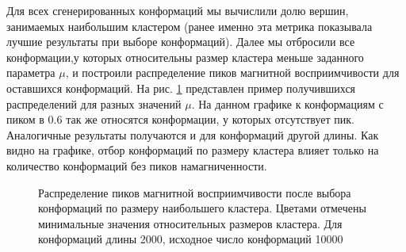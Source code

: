 Для всех сгенерированных конформаций мы вычислили долю вершин, занимаемых наибольшим кластером (ранее именно эта метрика показывала лучшие результаты при выборе конформаций). Далее мы отбросили все конформации,у которых относительны размер кластера меньше заданного параметра $\mu$, и построили распределение пиков магнитной восприимчивости для оставшихся конформаций. На рис. \ref{fig:peaks_chosen_by_cluster} представлен пример получившихся распределений для разных значений $\mu$. На данном графике к конформациям с пиком в 0.6 так же относятся конформации, у которых отсутствует пик. Аналогичные результаты получаются и для конформаций другой длины. Как видно на графике, отбор конформаций по размеру кластера влияет только на количество конформаций без пиков намагниченности.


\begin{figure}
	\centering
	
	\caption{Распределение пиков магнитной восприимчивости после выбора конформаций по размеру наибольшего кластера. Цветами отмечены минимальные значения относительных размеров кластера. Для конформаций длины 2000, исходное число конформаций 10000}
	\label{fig:peaks_chosen_by_cluster}

\end{figure}